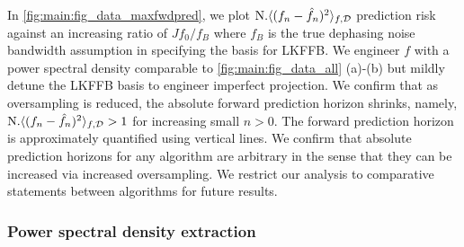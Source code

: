\documentclass[pra, reprint]{revtex4-1}
\begin{document}
In \cref{fig:main:fig_data_maxfwdpred}, we plot $\text{N.} \langle (f_n - \hat{f}_n)^2 \rangle_{f, \mathcal{D}}$ prediction risk against an increasing ratio of $Jf_0 / f_B$ where $f_B$ is the true dephasing noise bandwidth assumption in specifying the basis for LKFFB. We engineer $f$ with a power spectral density comparable to \cref{fig:main:fig_data_all} (a)-(b) but mildly detune the LKFFB basis to engineer imperfect projection. We confirm that as oversampling is reduced, the absolute forward prediction horizon shrinks, namely, $\text{N.} \langle (f_n - \hat{f}_n)^2 \rangle_{f, \mathcal{D}} > 1 $ for increasing small $n>0$. The forward prediction horizon is approximately quantified using vertical lines. We confirm that absolute prediction horizons for any algorithm are arbitrary in the sense that they can be increased via increased oversampling. We restrict our analysis to comparative statements between algorithms for future results. 

\subsubsection{Power spectral density extraction}
\end{document}
